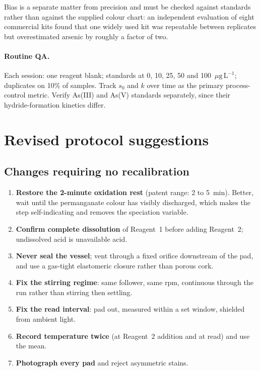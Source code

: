 \documentclass[11pt,a4paper]{article}
\newcommand{\ptl}{\ensuremath{\mu\mathrm{g\,L^{-1}}}}
\begin{document}
Bias is a separate matter from precision and must be checked against
standards rather than against the supplied colour chart: an independent
evaluation of eight commercial kits found that one widely used kit was
repeatable between replicates but overestimated arsenic by roughly a factor
of two.

\paragraph{Routine QA.} Each session: one reagent blank; standards at 0, 10,
25, 50 and 100~\ptl{}; duplicates on 10\% of samples. Track $s_0$ and $k$
over time as the primary process-control metric. Verify As(III) and As(V)
standards separately, since their hydride-formation kinetics differ.

\section{Revised protocol suggestions}

\subsection{Changes requiring no recalibration}

\begin{enumerate}[nosep]
  \item \textbf{Restore the 2-minute oxidation rest} (patent range: 2 to
        5~min). Better, wait until the permanganate colour has visibly
        discharged, which makes the step self-indicating and removes the
        speciation variable.
  \item \textbf{Confirm complete dissolution} of Reagent~1 before adding
        Reagent~2; undissolved acid is unavailable acid.
  \item \textbf{Never seal the vessel}; vent through a fixed orifice
        downstream of the pad, and use a gas-tight elastomeric closure
        rather than porous cork.
  \item \textbf{Fix the stirring regime}: same follower, same rpm,
        continuous through the run rather than stirring then settling.
  \item \textbf{Fix the read interval}: pad out, measured within a set
        window, shielded from ambient light.
  \item \textbf{Record temperature twice} (at Reagent~2 addition and at
        read) and use the mean.
  \item \textbf{Photograph every pad} and reject asymmetric stains.
\end{enumerate}
\end{document}
